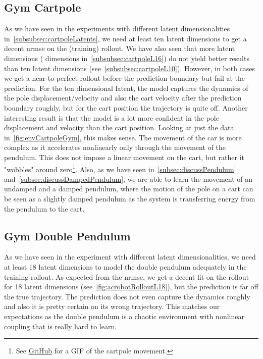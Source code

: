 	\subsection{Gym Cartpole}
		As we have seen in the experiments with different latent dimensionalities in~\autoref{subsubsec:cartpoleLatents}, we need at least ten latent dimensions to get a decent \ac{nrmse} on the (training) rollout. We have also seen that more latent dimensions ( dimensions in~\autoref{subsubsec:cartpoleL16}) do not yield better results than ten latent dimensions (see~\autoref{subsubsec:cartpoleL10}). However, in both cases we get a near-to-perfect rollout before the prediction boundary but fail at the prediction. For the ten dimensional latent, the model captures the dynamics of the pole displacement/velocity and also the cart velocity after the prediction boundary roughly, but for the cart position the trajectory is quite off. Another interesting result is that the model is a lot more confident in the pole displacement and velocity than the cart position. Looking at just the data in~\autoref{fig:envCartpoleGym}, this makes sense. The movement of the car is more complex as it accelerates nonlinearly only through the movement of the pendulum. This does not impose a linear movement on the cart, but rather it "wobbles" around zero\footnote{See \href{https://github.com/fdamken/bachelors-thesis/blob/b5a4acbc1d10fa0224a73201995222690d2fb6de/thesis/figures/cartpole.gif}{GitHub} for a GIF of the cartpole movement.}. Also, as we have seen in~\autoref{subsec:discussPendulum} and~\autoref{subsec:discussDampedPendulum}, we are able to learn the movement of an undamped and a damped pendulum, where the motion of the pole on a cart can be seen as a slightly damped pendulum as the system is transferring energy from the pendulum to the cart.


	\subsection{Gym Double Pendulum}
		As we have seen in the experiment with different latent dimensionalities, we need at least 18 latent dimensions to model the double pendulum adequately in the training rollout. As expected from the \ac{nrmse}, we get a decent fit on the rollout for 18 latent dimensions (see~\autoref{fig:acrobotRolloutL18}), but the prediction is far off the true trajectory. The prediction does not even capture the dynamics roughly and also it is pretty certain on its wrong trajectory. This matches our expectations as the double pendulum is a chaotic environment with nonlinear coupling that is really hard to learn.


